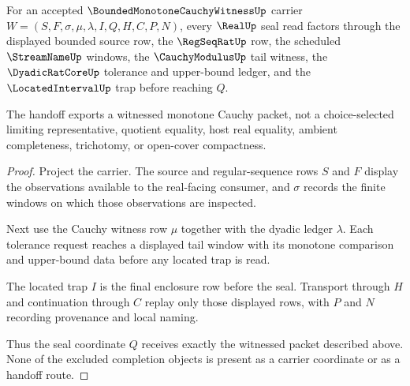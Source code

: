 \begin{theorem}
\label{thm:bounded-monotone-cauchy-witness-real-seal-handoff}
For an accepted $\BoundedMonotoneCauchyWitnessUp$ carrier $W=(S,F,\sigma,\mu,\lambda,I,Q,H,C,P,N)$, every $\RealUp$ seal read factors through the displayed bounded source row, the $\RegSeqRatUp$ row, the scheduled $\StreamNameUp$ windows, the $\CauchyModulusUp$ tail witness, the $\DyadicRatCoreUp$ tolerance and upper-bound ledger, and the $\LocatedIntervalUp$ trap before reaching $Q$.

The handoff exports a witnessed monotone Cauchy packet, not a choice-selected limiting representative, quotient equality, host real equality, ambient completeness, trichotomy, or open-cover compactness.
\end{theorem}
\begin{proof}
Project the carrier. The source and regular-sequence rows $S$ and $F$ display the observations available to the real-facing consumer, and $\sigma$ records the finite windows on which those observations are inspected.

Next use the Cauchy witness row $\mu$ together with the dyadic ledger $\lambda$. Each tolerance request reaches a displayed tail window with its monotone comparison and upper-bound data before any located trap is read.

The located trap $I$ is the final enclosure row before the seal. Transport through $H$ and continuation through $C$ replay only those displayed rows, with $P$ and $N$ recording provenance and local naming.

Thus the seal coordinate $Q$ receives exactly the witnessed packet described above. None of the excluded completion objects is present as a carrier coordinate or as a handoff route.
\end{proof}

